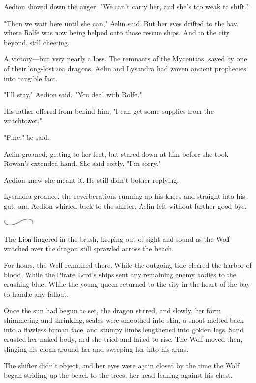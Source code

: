 Aedion shoved down the anger.
"We can't carry her, and she's too weak to shift."

"Then we wait here until she can," Aelin said.
But her eyes drifted to the bay, where Rolfe was now being helped onto those rescue ships.
And to the city beyond, still cheering.

A victory---but very nearly a loss.
The remnants of the Mycenians, saved by one of their long-lost sea dragons.
Aelin and Lysandra had woven ancient prophecies into tangible fact.

"I'll stay," Aedion said.
"You deal with Rolfe."

His father offered from behind him, "I can get some supplies from the watchtower."

"Fine," he said.

Aelin groaned, getting to her feet, but stared down at him before she took Rowan's extended hand.
She said softly, "I'm sorry."

Aedion knew she meant it.
He still didn't bother replying.

Lysandra groaned, the reverberations running up his knees and straight into his gut, and Aedion whirled back to the shifter.
Aelin left without further good-bye.

\begin{center}
	\includegraphics[width=0.65in,height=0.13in]{images/seperator}
\end{center}

The Lion lingered in the brush, keeping out of sight and sound as the Wolf watched over the dragon still sprawled across the beach.

For hours, the Wolf remained there.
While the outgoing tide cleared the harbor of blood.
While the Pirate Lord's ships sent any remaining enemy bodies to the crushing blue.
While the young queen returned to the city in the heart of the bay to handle any fallout.

Once the sun had begun to set, the dragon stirred, and slowly, her form shimmering and shrinking, scales were smoothed into skin, a snout melted back into a flawless human face, and stumpy limbs lengthened into golden legs.
Sand crusted her naked body, and she tried and failed to rise.
The Wolf moved then, slinging his cloak around her and sweeping her into his arms.

The shifter didn't object, and her eyes were again closed by the time the Wolf began striding up the beach to the trees, her head leaning against his chest.

